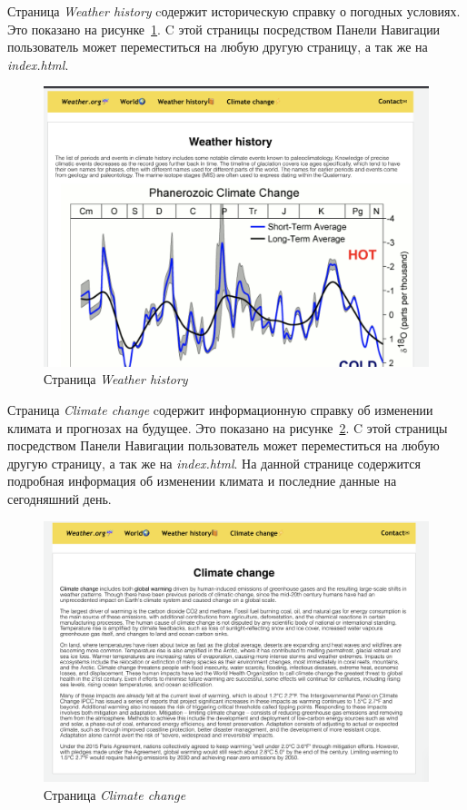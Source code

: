 \documentclass[a4paper,hidelinks,14pt]{extarticle}
\begin{document}

Страница \textit{Weather history} cодержит историческую справку о погодных условиях. Это показано на рисунке~\ref{fig:fig5}. C этой страницы посредством Панели Навигации пользователь может переместиться на любую другую страницу, а так же на\textit{ index.html}.

\begin{figure}[htbp]
    \centering
    \includegraphics[scale=0.3]{fig/history.png}
    \caption{Страница \textit{Weather history}}
    \label{fig:fig5}
\end{figure}



Страница \textit{Climate change} cодержит информационную справку об изменении климата и прогнозах на будущее. Это показано на рисунке~\ref{fig:fig6}. C этой страницы посредством Панели Навигации пользователь может переместиться на любую другую страницу, а так же на\textit{ index.html}. На данной странице содержится подробная информация об изменении климата и последние данные на сегодняшний день.

\begin{figure}[htbp!]
    \centering
    \includegraphics[scale=0.4]{fig/change.png}
    \caption{Страница \textit{Climate change}}
    \label{fig:fig6}
\end{figure}
\end{document}

